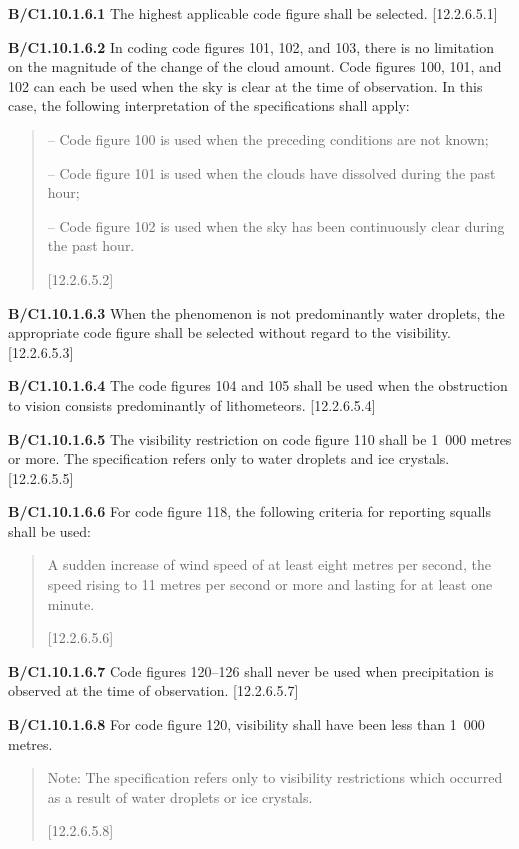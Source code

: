 \textbf{B/C1.10.1.6.1} The highest applicable code figure shall be selected. {[}12.2.6.5.1{]}

\textbf{B/C1.10.1.6.2} In coding code figures 101, 102, and 103, there is no limitation on the magnitude of the change of the cloud amount. Code figures 100, 101, and 102 can each be used when the sky is clear at the time of observation. In this case, the following interpretation of the specifications shall apply:

\begin{quote}
-- Code figure 100 is used when the preceding conditions are not known;

-- Code figure 101 is used when the clouds have dissolved during the past hour;

-- Code figure 102 is used when the sky has been continuously clear during the past hour.

{[}12.2.6.5.2{]}
\end{quote}

\textbf{B/C1.10.1.6.3} When the phenomenon is not predominantly water droplets, the appropriate code figure shall be selected without regard to the visibility. {[}12.2.6.5.3{]}

\textbf{B/C1.10.1.6.4} The code figures 104 and 105 shall be used when the obstruction to vision consists predominantly of lithometeors. {[}12.2.6.5.4{]}

\textbf{B/C1.10.1.6.5} The visibility restriction on code figure 110 shall be 1~000 metres or more. The specification refers only to water droplets and ice crystals. {[}12.2.6.5.5{]}

\textbf{B/C1.10.1.6.6} For code figure 118, the following criteria for reporting squalls shall be used:

\begin{quote}
A sudden increase of wind speed of at least eight metres per second, the speed rising to 11 metres per second or more and lasting for at least one minute.

{[}12.2.6.5.6{]}
\end{quote}

\textbf{B/C1.10.1.6.7} Code figures 120--126 shall never be used when precipitation is observed at the time of observation. {[}12.2.6.5.7{]}

\textbf{B/C1.10.1.6.8} For code figure 120, visibility shall have been less than 1~000 metres.

\begin{quote}
Note: The specification refers only to visibility restrictions which occurred as a result of water droplets or ice crystals.

{[}12.2.6.5.8{]}
\end{quote}

